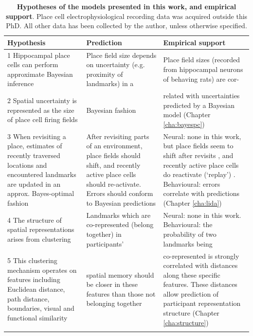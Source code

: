 \newpage

\setlength\tabcolsep{4pt}
\begin{longtable}{|p{4.5cm}|p{4.5cm}|p{4.6cm}|}
	\hline
	\textbf{Hypothesis} & \textbf{Prediction} & \textbf{Empirical support} \\
	\hline
	
	1 Hippocampal place cells can perform approximate Bayesian inference & {Place field size depends on uncertainty (e.g. proximity of landmarks) in a} & {Place field sizes (recorded from hippocampal neurons of behaving rats) are cor-} \\ \cline{1-1} 
	2 Spatial uncertainty is represented as the size of place cell firing fields & Bayesian fashion & related with uncertainties predicted by a Bayesian model (Chapter \ref{cha:bayespc}) \\ \hline
	3 When revisiting a place, estimates of recently traversed locations and encountered landmarks are updated in an approx. Bayes-optimal fashion & After revisiting parts of an environment, place fields should shift, and recently active place cells should re-activate. Errors should conform to Bayesian predictions & Neural: none in this work, but place fields seem to shift after revisits \citep{mehta2000experience}, and recently active place cells do reactivate (`replay') \citep{carr2011hippocampal}. Behavioural: errors correlate with predictions (Chapter \ref{cha:lida}) \\ \hline 
	4 The structure of spatial representations arises from clustering & Landmarks which are co-represented (belong together) in participants' & Neural: none in this work. Behavioural: the probability of two landmarks being \\ \cline{1-1}
	5 This clustering mechanism operates on features including Euclidean distance, path distance, boundaries, visual and functional similarity & spatial memory should be closer in these features than those not belonging together & co-represented is strongly correlated with distances along these specific features. These distances allow prediction of participant representation structure (Chapter \ref{cha:structure}) \\
	
	\hline
	\captionsetup{width=\textwidth}
	\caption[Hypotheses of the models presented in this work]{\textbf{Hypotheses of the models presented in this work, and empirical support}. Place cell electrophysiological recording data was acquired outside this PhD. All other data has been collected by the author, unless otherwise specified.}
	\label{tbl:hyp}
\end{longtable}


